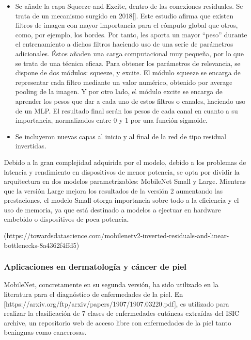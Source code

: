 \begin{itemize}
    \item Se añade la capa Squeeze-and-Excite, dentro de las conexiones residuales. Se trata de un mecanismo surgido en 2018[]. Este estudio afirma que existen filtros de imagen con mayor importancia para el cómputo global que otros, como, por ejemplo, los bordes. Por tanto, les aporta un mayor ``peso'' durante el entrenamiento a dichos filtros haciendo uso de una serie de parámetros adicionales. Éstos añaden una carga computacional muy pequeña, por lo que se trata de una técnica eficaz. Para obtener los parámetros de relevancia, se dispone de dos módulos: squeeze, y excite. El módulo squeeze se encarga de representar cada filtro mediante un valor numérico, obtenido por average pooling de la imagen. Y por otro lado, el módulo excite se encarga de aprender los pesos que dar a cada uno de estos filtros o canales, haciendo uso de un MLP. El resultado final serán los pesos de cada canal en cuanto a su importancia, normalizados entre 0 y 1 por una función sigmoide.

    \item Se incluyeron nuevas capas al inicio y al final de la red de tipo residual invertidas.
\end{itemize}

Debido a la gran complejidad adquirida por el modelo, debido a los problemas de latencia y rendimiento en dispositivos de menor potencia, se opta por dividir la arquitectura en dos modelos parametrizables: MobileNet Small y Large. Mientras que la versión Large mejora los resultados de la versión 2 aumentando las prestaciones, el modelo Small otorga importancia sobre todo a la eficiencia y el uso de memoria, ya que está destinado a modelos a ejectuar en hardware embebido o dispositivos de poca potencia.


(https://towardsdatascience.com/mobilenetv2-inverted-residuals-and-linear-bottlenecks-8a4362f4ffd5)

\subsubsection{Aplicaciones en dermatología y cáncer de piel}

MobileNet, concretamente en su segunda versión, ha sido utilizado en la literatura para el diagnóstico de enfermedades de la piel. En [https://arxiv.org/ftp/arxiv/papers/1907/1907.03220.pdf], es utilizado para realizar la clasificación de 7 clases de enfermedades cutáneas extraídas del ISIC archive, un repositorio web de acceso libre con enfermedades de la piel tanto beningnas como cancerosas.\\

